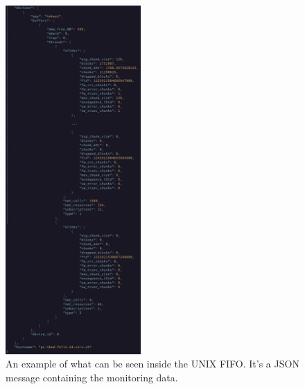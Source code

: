 \clearpage
\begin{figure}[htbp]
\centering
\includegraphics[width=0.46\textwidth]{images/results/fifo-monitor.png}
\caption[Monitoring FIFO example]{An example of what can be seen inside the UNIX FIFO. It's a JSON message containing the monitoring data.}
\label{fig:fifo-monitoring}
\end{figure}

